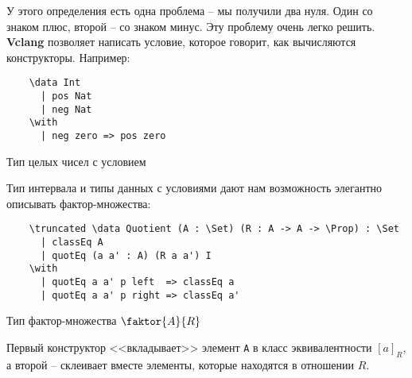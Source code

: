 У этого определения есть одна проблема -- мы получили два нуля. Один со знаком плюс, второй -- со знаком минус. Эту проблему очень легко решить. \textbf{Vclang} позволяет написать условие, которое говорит, как вычисляются конструкторы. Например:

\begin{listing}[H]
  \begin{verbatim}
    \data Int
      | pos Nat
      | neg Nat
    \with
      | neg zero => pos zero
  \end{verbatim}
  \caption{Тип целых чисел с условием}
\end{listing}

Тип интервала и типы данных с условиями дают нам возможность элегантно описывать фактор-множества:

\begin{listing}[H]
  \begin{verbatim}
    \truncated \data Quotient (A : \Set) (R : A -> A -> \Prop) : \Set
      | classEq A
      | quotEq (a a' : A) (R a a') I
    \with
      | quotEq a a' p left  => classEq a
      | quotEq a a' p right => classEq a'
  \end{verbatim}
  \caption{Тип фактор-множества $\faktor{A}{R}$}
\end{listing}

Первый конструктор <<вкладывает>> элемент \texttt{A} в класс эквивалентности $[a]_{R}$, а второй -- склеивает вместе элементы, которые находятся в отношении $R$.
